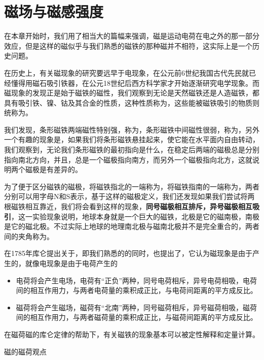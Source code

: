 \section{磁场与磁感强度}
在本章开始时，我们用了相当大的篇幅来强调，磁是运动电荷在电之外的那一部分效应，但是这样的磁似乎与我们熟悉的磁铁的那种磁并不相符，这实际上是一个历史问题。 

在历史上，有关磁现象的研究要远早于电现象，在公元前6世纪我国古代先民就已经懂得用磁石吸引铁器，在公元18世纪后西方科学家才开始逐渐研究电学现象。而磁现象的发现正是始于磁铁的磁性，我们观察到无论是天然磁铁还是人造磁铁，都具有吸引铁、镍、钴及其合金的性质，这种性质称为，这些能被磁铁吸引的物质则统称为。

我们发现，条形磁铁两端磁性特别强，称为，条形磁铁中间磁性很弱，称为，另外一个有趣的现象是，如果我们将条形磁铁悬挂起来，使它能在水平面内自由转动，我们观察到，无论我们条形磁铁的最初指向是什么，在稳定后两端的磁极总是分别指向南北方向，并且，总是一个磁极指向南方，而另外一个磁极指向北方，这就说明两个磁极是有差异的。

为了便于区分磁铁的磁极，将磁铁指北的一端称为，将磁铁指南的一端称为，两者分别可以用字母N和S表示，基于这样的磁极定义，我们还发现如果我们尝试将两根磁铁相互靠近，我们将会看到这样的现象，\textbf{同号磁极相互排斥，异号磁极相互吸引}，这一实验现象说明，地球本身就是一个巨大的磁铁，北极是它的磁南极，南极是它的磁北极。不过实际上地球的地理南北极与磁南北极并不是完全重合的，两者间的夹角称为。

在1785年库仑提出关于，即我们熟悉的的同时，也提出了，它认为磁现象是由于产生的，就像电现象是由于电荷产生的
\begin{itemize}
    \item 电荷将会产生电场，电荷有“正负”两种，同号电荷相斥，异号电荷相吸，电荷间的相互作用力，与两者电荷量的乘积成正比，与电荷间距离的平方成反比。
    \item 磁荷将会产生磁场，磁荷有“北南”两种，同号磁荷相斥，异号磁荷相吸，磁荷间的相互作用力，与两者磁荷量的乘积成正比，与磁荷间距离的平方成反比。
\end{itemize}
在磁荷磁的库仑定律的帮助下，有关磁铁的现象基本可以被定性解释和定量计算。

\begin{Figure}{磁的磁荷观点}
    \\
    \\
\end{Figure}

